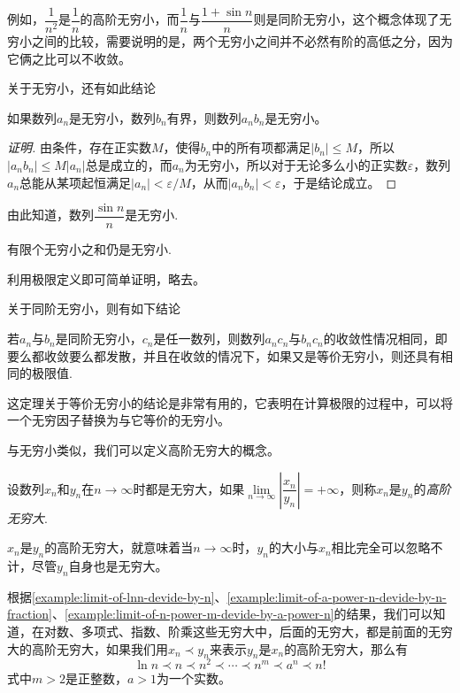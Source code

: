 例如，$\dfrac{1}{n^2}$是$\dfrac{1}{n}$的高阶无穷小，而$\dfrac{1}{n}$与$\dfrac{1+\sin{n}}{n}$则是同阶无穷小，这个概念体现了无穷小之间的比较，需要说明的是，两个无穷小之间并不必然有阶的高低之分，因为它俩之比可以不收敛。


关于无穷小，还有如此结论
\begin{theorem}
  如果数列$a_n$是无穷小，数列$b_n$有界，则数列$a_nb_n$是无穷小。
\end{theorem}

\begin{proof}[证明]
  由条件，存在正实数$M$，使得$b_n$中的所有项都满足$|b_n|\leqslant M$，所以$|a_nb_n| \leqslant M |a_n|$总是成立的，而$a_n$为无穷小，所以对于无论多么小的正实数$\varepsilon$，数列$a_n$总能从某项起恒满足$|a_n|<\varepsilon/M$，从而$|a_nb_n|<\varepsilon$，于是结论成立。
\end{proof}

由此知道，数列$\dfrac{\sin{n}}{n}$是无穷小.

\begin{theorem}
  有限个无穷小之和仍是无穷小.
\end{theorem}

利用极限定义即可简单证明，略去。

关于同阶无穷小，则有如下结论
\begin{theorem}
  若$a_n$与$b_n$是同阶无穷小，$c_n$是任一数列，则数列$a_nc_n$与$b_nc_n$的收敛性情况相同，即要么都收敛要么都发散，并且在收敛的情况下，如果又是等价无穷小，则还具有相同的极限值.
\end{theorem}

这定理关于等价无穷小的结论是非常有用的，它表明在计算极限的过程中，可以将一个无穷因子替换为与它等价的无穷小。

与无穷小类似，我们可以定义高阶无穷大的概念。

\begin{definition}
  设数列$x_n$和$y_n$在$n\to\infty$时都是无穷大，如果$\lim\limits_{n \to \infty} \left| \dfrac{x_n}{y_n} \right| = +\infty$，则称$x_n$是$y_n$的\emph{高阶无穷大}.
\end{definition}

$x_n$是$y_n$的高阶无穷大，就意味着当$n\to\infty$时，$y_n$的大小与$x_n$相比完全可以忽略不计，尽管$y_n$自身也是无穷大。

\begin{example}
  \label{example:infinite-large-compare}
  根据\autoref{example:limit-of-lnn-devide-by-n}、\autoref{example:limit-of-a-power-n-devide-by-n-fraction}、\autoref{example:limit-of-n-power-m-devide-by-a-power-n}的结果，我们可以知道，在对数、多项式、指数、阶乘这些无穷大中，后面的无穷大，都是前面的无穷大的高阶无穷大，如果我们用$x_n \prec y_n$来表示$y_n$是$x_n$的高阶无穷大，那么有
  \[ \ln{n} \prec n \prec n^2 \prec \cdots \prec n^m \prec a^n \prec n! \]
  式中$m>2$是正整数，$a>1$为一个实数。
\end{example}

